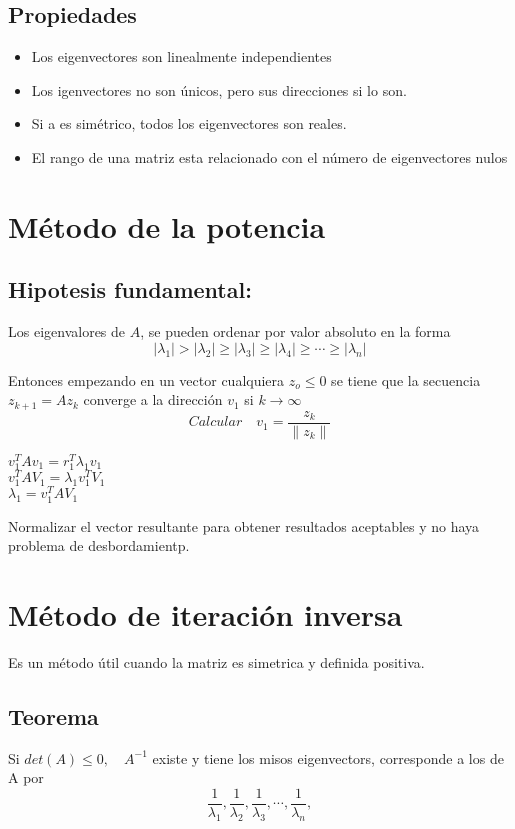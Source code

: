 \subsection*{Propiedades}
\begin{itemize}
\item Los eigenvectores son linealmente independientes
\item Los igenvectores no son \'unicos, pero sus direcciones si lo son.
\item Si a es sim\'etrico, todos los eigenvectores son reales.
\item El rango de una matriz esta relacionado con el n\'umero de eigenvectores nulos
\end{itemize}
\section{M\'etodo de la potencia}
\subsection*{Hipotesis fundamental:}
Los eigenvalores de $A$, se pueden ordenar por valor absoluto en la forma
\begin{displaymath}
|\lambda_1|>|\lambda_2|\geq |\lambda_3|\geq|\lambda_4|\geq\cdots\geq|\lambda_n|
\end{displaymath}

Entonces empezando en un vector cualquiera $z_o\leq 0$ se tiene que la secuencia $z_{k+1}=Az_k$ converge a la direcci\'on $v_1$ si $k \to \infty$\\
\begin{displaymath}
Calcular \quad v_1=\frac{z_k}{\parallel z_k \parallel}
\end{displaymath}
\begin{center}
$v_1^TAv_1=r_1^T\lambda_1v_1$\\
$v_1^TAV_1=\lambda_1v_1^TV_1$\\
$\lambda_1=v_1^TAV_1$
\end{center}
Normalizar el vector resultante para obtener resultados aceptables y no haya problema de desbordamientp.

\section{M\'etodo de iteraci\'on inversa}
Es un m\'etodo \'util cuando la matriz es simetrica y definida positiva.
\subsection*{Teorema}
Si $det(A)\leq 0,\quad A^{-1}$ existe y tiene los misos eigenvectors, corresponde a los de A por 
\begin{displaymath}
\frac{1}{\lambda_1},\frac{1}{\lambda_2},\frac{1}{\lambda_3},\cdots,\frac{1}{\lambda_n},
\end{displaymath}

